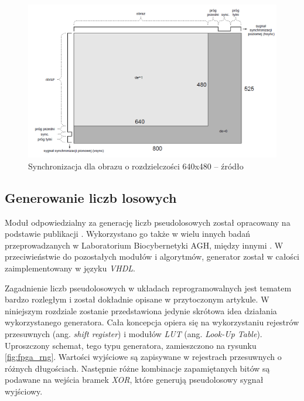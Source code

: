 	\begin{figure}[h!]
        \centering
		\includegraphics[scale=0.55]{img/4/sync_signals.png}
		\caption{Synchronizacja dla obrazu o rozdzielczości 640x480 -- źródło \cite{komorkiewicz_14}}
		\label{fig:fpga_sync_signals}
	\end{figure}


\subsection{Generowanie liczb losowych}
\label{subsec:fpga_generator}

Moduł odpowiedzialny za generację liczb pseudolosowych został opracowany na podstawie publikacji \cite{thomas_10}. Wykorzystano go także w wielu innych badań przeprowadzanych w Laboratorium Biocybernetyki AGH, między innymi \cite{kryjak_14_vibe, kryjak_14_pbas}. W przeciwieństwie do pozostałych modułów i algorytmów, generator został w całości zaimplementowany w języku \textit{VHDL}.

Zagadnienie liczb pseudolosowych w układach reprogramowalnych jest tematem bardzo rozległym i został dokładnie opisane w przytoczonym artykule. W niniejszym rozdziale zostanie przedstawiona jedynie skrótowa idea działania wykorzystanego generatora. Cała koncepcja opiera się na wykorzystaniu rejestrów przesuwnych (ang. \textit{shift register}) i modułów \textit{LUT} (ang. \textit{Look-Up Table}). Uproszczony schemat, tego typu generatora, zamieszczono na rysunku \ref{fig:fpga_rng}. Wartości wyjściowe są zapisywane w rejestrach przesuwnych o różnych długościach. Następnie różne kombinacje zapamiętanych bitów są podawane na wejścia bramek \textit{XOR}, które generują pseudolosowy sygnał wyjściowy.

